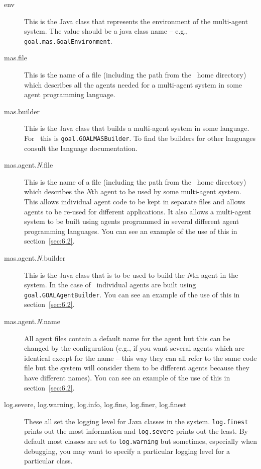 \documentclass[a4]{article}
\begin{document}
\begin{sloppypar}
\begin{description}
\item[env] This is the Java class that represents the environment of the multi-agent system.  The value should be a java class name -- e.g., \texttt{goal.mas.GoalEnvironment}.
\item[mas.file] This is the name of a file (including the path from the \mcapl\ home directory) which describes all the agents needed for a multi-agent system in some agent programming language.
\item[mas.builder] This is the Java class that builds a multi-agent system in some language.  For \goal\ this is \texttt{goal.GOALMASBuilder}.  To find the builders for other languages consult the language documentation.
\item[mas.agent.\emph{N}.file] This is the name of a file (including the path from the \mcapl\ home directory) which describes the \emph{N}th agent to be used by some multi-agent system.  This allows individual agent code to be kept in separate files and allows agents to be re-used for different applications.  It also allows a multi-agent system to be built using agents programmed in several different agent programming languages.  You can see an example of the use of this in section~\ref{sec:6.2}.
\item[mas.agent.\emph{N}.builder] This is the Java class that is to be used to build the \emph{N}th agent in the system.  In the case of \goal\ individual agents are built using \texttt{goal.GOALAgentBuilder}.  You can see an example of the use of this in section~\ref{sec:6.2}.
\item[mas.agent.\emph{N}.name] All agent files contain a default name for the agent but this can be changed by the configuration (e.g., if you want several agents which are identical except for the name -- this way they can all refer to the same code file but the system will consider them to be different agents because they have different names).  You can see an example of the use of this in section~\ref{sec:6.2}.
\item[log.severe, log.warning, log.info, log.fine, log.finer, log.finest] These all set the logging level for Java classes in the system.  \texttt{log.finest} prints out the most information and \texttt{log.severe} prints out the least.  By default most classes are set to \texttt{log.warning} but sometimes, especially when debugging, you may want to specify a particular logging level for a particular class. 

\end{description}
\end{sloppypar}
\end{document}
